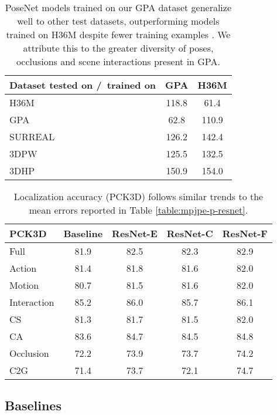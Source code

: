 \documentclass[times,referee,twocolumn,final,authoryear]{elsarticle}
\begin{document}
\begin{table}[t]
\begin{center}
\small
\begin{tabular}{l|c|c}
\hline
Dataset tested on /\ trained on  & GPA & H36M\\
\hline
H36M \cite{h36m_pami} & 118.8 & 61.4\\
GPA   & 62.8  & 110.9 \\
SURREAL \cite{varol17_surreal} & 126.2 & 142.4\\
3DPW \cite{inthewildeccv2018} & 125.5 & 132.5 \\
3DHP \cite{mono_3dhp2017} & 150.9 & 154.0\\
\hline
\end{tabular}
\end{center}
\caption{PoseNet models trained on our GPA dataset generalize well to other test datasets, outperforming models trained on H36M despite  fewer training examples \citep{crossdatasetevaluation}. We attribute this to the greater diversity of poses, occlusions and scene interactions present in GPA.}
\label{table:otherdataset}
\end{table}

\begin{table}[t]
\begin{center}
\small
\begin{tabular}{l|c|c|c|c}
\hline
PCK3D & Baseline & ResNet-E & ResNet-C & ResNet-F \\
\hline
Full & 81.9 & 82.5 &  82.3 & 82.9 \\
\hline\hline
Action & 81.4 & 81.8 & 81.6 & 82.0 \\
Motion & 80.7 & 81.5 & 81.6 & 82.0 \\
Interaction & 85.2 & 86.0 & 85.7 & 86.1 \\
\hline
\hline
CS & 81.3 & 81.7 & 81.5 & 82.0 \\
CA & 83.6 & 84.7 & 84.5 & 84.8 \\
\hline
\hline
Occlusion & 72.2 & 73.9 & 73.7 & 74.2 \\
C2G & 71.4 & 73.7 & 72.1 & 74.7  \\
\hline
\end{tabular}
\end{center}
\caption{Localization accuracy (PCK3D) follows similar trends to the mean errors 
reported in Table \ref{table:mpjpe-p-resnet}.}
\label{table:pck3d-p-resnet}
\end{table}

\subsection{Baselines}
\end{document}
